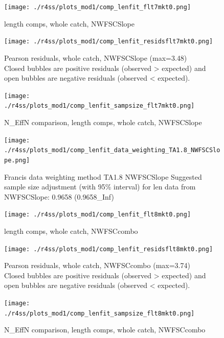 \documentclass[12pt,]{article}
\begin{document}
\begin{figure}
\centering
\texttt{[image: ./r4ss/plots\_mod1/comp\_lenfit\_flt7mkt0.png]}
\caption{length comps, whole catch, NWFSCSlope
\label{fig:mod1_26_comp_lenfit_flt7mkt0}}
\end{figure}

\begin{figure}
\centering
\texttt{[image: ./r4ss/plots\_mod1/comp\_lenfit\_residsflt7mkt0.png]}
\caption{Pearson residuals, whole catch, NWFSCSlope (max=3.48)\\
Closed bubbles are positive residuals (observed \textgreater{} expected)
and open bubbles are negative residuals (observed \textless{} expected).
\label{fig:mod1_27_comp_lenfit_residsflt7mkt0}}
\end{figure}

\begin{figure}
\centering
\texttt{[image: ./r4ss/plots\_mod1/comp\_lenfit\_sampsize\_flt7mkt0.png]}
\caption{N\_EffN comparison, length comps, whole catch, NWFSCSlope
\label{fig:mod1_28_comp_lenfit_sampsize_flt7mkt0}}
\end{figure}

\begin{figure}
\centering
\texttt{[image: ./r4ss/plots\_mod1/comp\_lenfit\_data\_weighting\_TA1.8\_NWFSCSlope.png]}
\caption{Francis data weighting method TA1.8 NWFSCSlope Suggested sample
size adjustment (with 95\% interval) for len data from NWFSCSlope:
0.9658 (0.9658\_Inf)
\label{fig:mod1_29_comp_lenfit_data_weighting_TA1.8_NWFSCSlope}}
\end{figure}

\begin{figure}
\centering
\texttt{[image: ./r4ss/plots\_mod1/comp\_lenfit\_flt8mkt0.png]}
\caption{length comps, whole catch, NWFSCcombo
\label{fig:mod1_30_comp_lenfit_flt8mkt0}}
\end{figure}

\begin{figure}
\centering
\texttt{[image: ./r4ss/plots\_mod1/comp\_lenfit\_residsflt8mkt0.png]}
\caption{Pearson residuals, whole catch, NWFSCcombo (max=3.74)\\
Closed bubbles are positive residuals (observed \textgreater{} expected)
and open bubbles are negative residuals (observed \textless{} expected).
\label{fig:mod1_31_comp_lenfit_residsflt8mkt0}}
\end{figure}

\begin{figure}
\centering
\texttt{[image: ./r4ss/plots\_mod1/comp\_lenfit\_sampsize\_flt8mkt0.png]}
\caption{N\_EffN comparison, length comps, whole catch, NWFSCcombo
\label{fig:mod1_32_comp_lenfit_sampsize_flt8mkt0}}
\end{figure}
\end{document}

